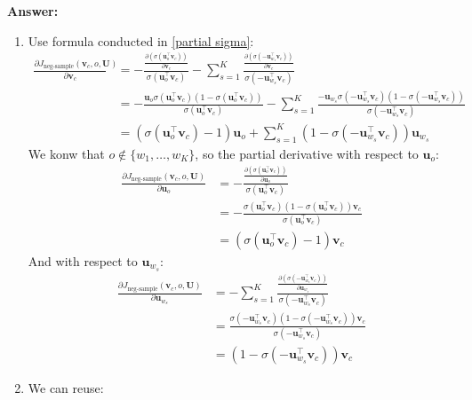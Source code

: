 \documentclass{article}
\newenvironment{answer}{
    {\bf Answer:} \sf \begingroup\color{red}
}{\endgroup}%
\begin{document}
\begin{enumerate}[label=(\alph*)]
\begin{shaded}
\begin{answer}
\begin{enumerate}[label = (\roman*)]
    \item Use formula conducted in \ref{partial sigma}:
    \begin{align*}
        \frac{\partial J_{\text{neg-sample}}(\bm v_c, o, \bm U)}{\partial \bm v_c}
        & = -\frac{\frac{\partial (\sigma(\bm u_o^\top \bm v_c))}{\partial \bm v_c}}{\sigma(\bm u_o^\top \bm v_c)} - \sum_{s=1}^K \frac{\frac{\partial (\sigma(- \bm u_{w_s}^\top \bm v_c))}{\partial \bm v_c}}{\sigma(-\bm u_{w_s}^\top \bm v_c)}\\
        & = -\frac{\bm u_o \sigma(\bm u_o^\top \bm v_c)(1 - \sigma(\bm u_o^\top \bm v_c))}{\sigma(\bm u_o^\top \bm v_c)} - \sum_{s=1}^K \frac{- \bm u_{w_s}\sigma(-\bm u_{w_s}^\top \bm v_c)(1 - \sigma(-\bm u_{w_s}^\top \bm v_c))}{\sigma(-\bm u_{w_s}^\top \bm v_c)} \\
        & = (\sigma(\bm u_o^\top \bm v_c) - 1)\bm u_o + \sum_{s=1}^K(1 - \sigma(-\bm u_{w_s}^\top \bm v_c))\bm u_{w_s}
    \end{align*}
    \color{red}
    We konw that $o\notin\{w_1, \dots, w_K\}$, so the partial derivative with respect to $\bm u_o$:
    \begin{align*}
        \frac{\partial J_{\text{neg-sample}}(\bm v_c, o, \bm U)}{\partial \bm u_o}
        & = -\frac{\frac{\partial (\sigma(\bm u_o^\top \bm v_c))}{\partial \bm u_o}}{\sigma(\bm u_o^\top \bm v_c)} \\
        & = -\frac{\sigma(\bm u_o^\top \bm v_c)(1 - \sigma(\bm u_o^\top \bm v_c))\bm v_c}{\sigma(\bm u_o^\top \bm v_c)} \\
        & = (\sigma(\bm u_o^\top \bm v_c) - 1)\bm v_c
    \end{align*}
    And with respect to $\bm u_{w_s}$:
    \begin{align*} \label{neg-sample partial uws}
        \frac{\partial J_{\text{neg-sample}}(\bm v_c, o, \bm U)}{\partial \bm u_{w_s}}
        & = - \sum_{s=1}^K \frac{\frac{\partial (\sigma(- \bm u_{w_s}^\top \bm v_c))}{\partial \bm u_{w_s}}}{\sigma(-\bm u_{w_s}^\top \bm v_c)} \\
        & = \frac{\sigma(-\bm u_{w_s}^\top \bm v_c)(1 - \sigma(-\bm u_{w_s}^\top \bm v_c)) \bm v_c}{\sigma(-\bm u_{w_s}^\top \bm v_c)} \\
        & = (1 - \sigma(-\bm u_{w_s}^\top \bm v_c))\bm v_c
        \tag{$***$}
    \end{align*}
    \item We can reuse:
    

\end{enumerate}
\end{answer}
\end{shaded}
\end{enumerate}
\end{document}
